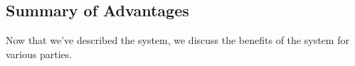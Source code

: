 


\subsection{Summary of Advantages}
Now that we've described the system, we discuss the benefits of the system for various parties.

